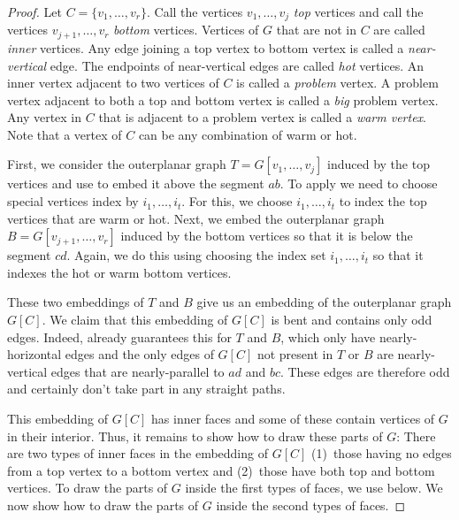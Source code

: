 \documentclass{patmorin}
\begin{document}
\begin{proof}
  Let $C=\{v_1,\ldots,v_r\}$. Call the vertices $v_1,\ldots,v_j$
  \emph{top} vertices and call the vertices $v_{j+1},\ldots,v_r$
  \emph{bottom} vertices. Vertices of $G$ that are not in $C$ are
  called \emph{inner} vertices.  Any edge joining a top vertex to
  bottom vertex is called a \emph{near-vertical} edge.  The endpoints of
  near-vertical edges are called \emph{hot} vertices.  An inner vertex
  adjacent to two vertices of $C$ is called a \emph{problem} vertex. A
  problem vertex adjacent to both a top and bottom vertex is called a
  \emph{big} problem vertex.  Any vertex in $C$ that is adjacent to a
  problem vertex is called a \emph{warm vertex}. Note that a vertex of
  $C$ can be any combination of warm or hot.

  First, we consider the outerplanar graph $T=G[v_1,\ldots,v_j]$ induced
  by the top vertices and use  to embed it
  above the segment $ab$.  To apply  we need
  to choose special vertices index by $i_1,\ldots,i_t$. For this, we
  choose $i_1,\ldots,i_t$ to index the top vertices that are warm or hot.
  Next, we embed the outerplanar graph $B=G[v_{j+1},\ldots,v_{r}]$
  induced by the bottom vertices so that it is below the segment $cd$.
  Again, we do this using  choosing the index
  set $i_1,\ldots,i_t$ so that it indexes the hot or warm bottom vertices.

  These two embeddings of $T$ and $B$ give us an embedding of the
  outerplanar graph $G[C]$.  We claim that this embedding of $G[C]$ is
  bent and contains only odd edges.  Indeed, 
  already guarantees this for $T$ and $B$, which only have
  nearly-horizontal edges and the only edges of $G[C]$ not present in
  $T$ or $B$ are nearly-vertical edges that are nearly-parallel to $ad$
  and $bc$.  These edges are therefore odd and certainly don't take part
  in any straight paths.

  This embedding of $G[C]$ has inner faces and some of these contain
  vertices of $G$ in their interior. Thus, it remains to show how to
  draw these parts of $G$:  There are two types of inner faces in the
  embedding of $G[C]$ (1)~those having no edges from a top vertex to
  a bottom vertex and (2)~those have both top and bottom vertices.
  To draw the parts of $G$ inside the first types of faces, we use
   below. We now show how to draw the parts of $G$
  inside the second types of faces.


\end{proof}
\end{document}
